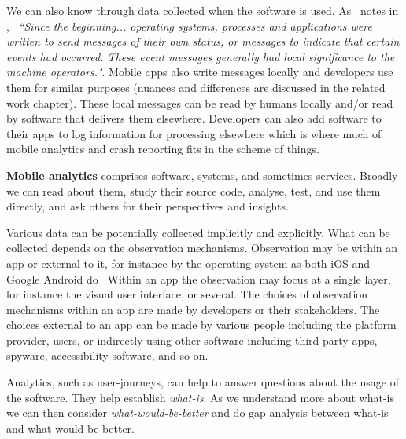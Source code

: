We can also know through data collected when the software is used. As~ notes in , ~\emph{``Since the beginning... operating systems, processes and applications were written to send messages of their own status, or messages to indicate that certain events had occurred. These event messages generally had local significance to the machine operators."}. Mobile apps also write messages locally and developers use them for similar purposes (nuances and differences are discussed in the related work chapter). These local messages can be read by humans locally and/or read by software that delivers them elsewhere. Developers can also add software to their apps to log information for processing elsewhere which is where much of mobile analytics and crash reporting fits in the scheme of things.

\textbf{Mobile analytics} comprises software, systems, and sometimes services. Broadly we can read about them, study their source code, analyse, test, and use them directly, and ask others for their perspectives and insights. 

Various data can be potentially collected implicitly and explicitly. What can be collected depends on the observation mechanisms. Observation may be within an app or external to it, for instance by the operating system as both iOS  and Google Android do~ %
%
Within an app the observation may focus at a single layer, for instance the visual user interface, or several. The choices of observation mechanisms within an app are made by developers or their stakeholders. The choices external to an app can be made by various people including the platform provider, users, or indirectly using other software including third-party apps, spyware, accessibility software, and so on.

Analytics, such as user-journeys, can help to answer questions about the usage of the software. They help establish \emph{what-is}. As we understand more about what-is we can then consider \emph{what-would-be-better} and do gap analysis between what-is and what-would-be-better.

